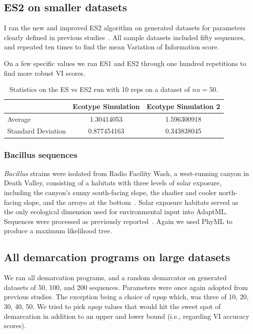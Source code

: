 \subsection*{ES2 on smaller datasets}
I ran the new and improved ES2 algorithm on generated datasets for parameters clearly defined in previous studies~\cite{carlo}.
All sample datasets included fifty sequences, and repeated ten times to find the mean Variation of Information score.

On a few specific values we ran ES1 and ES2 through one hundred repetitions to find more robust VI scores.

\begin{table}
    \begin{tabular}{l|cc}
    ~                  & Ecotype Simulation & Ecotype Simulation 2 \\ \hline
    Average            & 1.30414053         & 1.596300918          \\
    Standard Deviation & 0.877454163        & 0.343838045          \\
    \end{tabular}
    \caption[ES versus ES2 statistics.]{Statistics on the ES vs ES2 run with 10 reps on a dataset of $nu=50$.}
    \label{tab:ESvES2mean}
\end{table}


\subsubsection*{Bacillus sequences}
\emph{Bacillus} strains were isolated from Radio Facility Wash, a west-running canyon in Death Valley, consisting of a habitats with three levels of solar exposure, including the canyon's sunny south-facing slope, the shadier and cooler north-facing slope, and the arroyo at the bottom~\cite{connor2010ecology}.
Solar exposure habitats served as the only ecological dimension used for environmental input into AdaptML.
Sequences were processed as previously reported~\cite{carlo}.
Again we used PhyML to produce a maximum likelihood tree.

\subsection*{All demarcation programs on large datasets}
We ran all demarcation programs, and a random demarcator on generated datasets of 50, 100, and 200 sequences.
Parameters were once again adopted from previous studies.
The exception being a choice of $npop$ which, was three of 10, 20, 30, 40, 50.
We tried to pick $npop$ values that would hit the sweet spot of demarcation in addition to an upper and lower bound (i.e., regarding VI accuracy scores).


